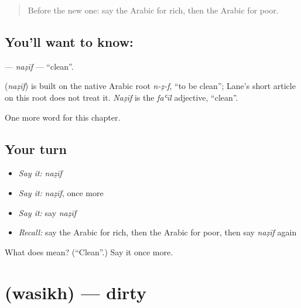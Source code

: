 \label{lesson:AR-C84-nazif}



\begin{quote}
Before the new one: say the Arabic for rich, then the Arabic for poor.
\end{quote}

\subsection*{You'll want to know: }
\textbf{} — \emph{naẓīf} — \textquotedblleft{}clean\textquotedblright{}.

\begin{cousinweb}
\textbf{} (\emph{naẓīf}) is built on the native Arabic root \emph{n-ẓ-f}, \textquotedblleft{}to be clean\textquotedblright{}; Lane's short article on this root does not treat it. \emph{Naẓīf} is the \emph{faʿīl} adjective, \textquotedblleft{}clean\textquotedblright{}.
\end{cousinweb}

\begin{grammarlens}[title={What you've built}]
One more word for this chapter.
\end{grammarlens}

\subsection*{Your turn}
\begin{itemize}
\raggedright
  \item \emph{Say it:} \emph{naẓīf}
  \item \emph{Say it:} \emph{naẓīf}, once more
  \item \emph{Say it:} say \emph{naẓīf}
  \item \emph{Recall:} say the Arabic for rich, then the Arabic for poor, then say \emph{naẓīf} again
\end{itemize}

\begin{tcolorbox}[breakable,colback=teal!4,colframe=teal!35!black,title={Before you move on}]
What does  mean? (\textquotedblleft{}Clean\textquotedblright{}.) Say it once more.
\end{tcolorbox}
\section[\texorpdfstring{\ar{وسخ} (wasikh)}{وسخ (wasikh)}]{ (wasikh) — dirty}


